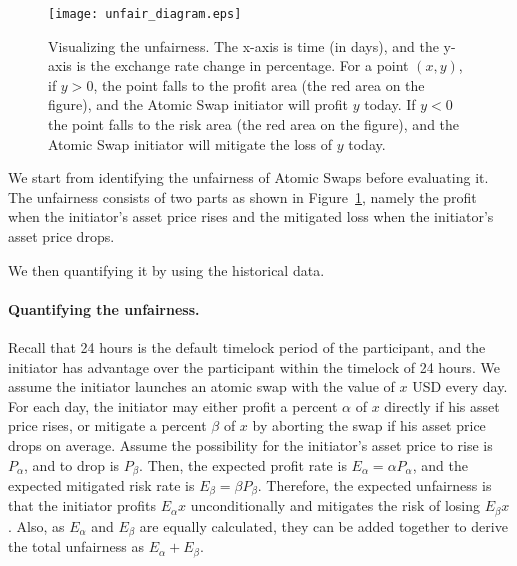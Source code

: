 \begin{figure}
    \texttt{[image: unfair\_diagram.eps]}
    \caption{Visualizing the unfairness. The x-axis is time (in days), and the y-axis is the exchange rate change in percentage. For a point $(x, y)$, if $y > 0$, the point falls to the profit area (the red area on the figure), and the Atomic Swap initiator will profit $y$ today. If $y < 0$ the point falls to the risk area (the red area on the figure), and the Atomic Swap initiator will mitigate the loss of $y$ today. }
    \label{fig:unfair_diagram}
\end{figure}

We start from identifying the unfairness of Atomic Swaps before evaluating it.
The unfairness consists of two parts as shown in Figure~\ref{fig:unfair_diagram}, namely the profit when the initiator's asset price rises and the mitigated loss when the initiator's asset price drops.

We then quantifying it by using the historical data.

\paragraph{Quantifying the unfairness.}
Recall that 24 hours is the default timelock period of the participant, 
and the initiator has advantage over the participant within the timelock of 24 hours.
We assume the initiator launches an atomic swap with the value of $x$ USD every day. 
For each day, the initiator may either profit a percent $\alpha$ of $x$ directly if his asset price rises,
or mitigate a percent $\beta$ of $x$ by aborting the swap if his asset price drops on average. 
Assume the possibility for the initiator's asset price to rise is $P_{\alpha}$, and to drop is $P_{\beta}$.
Then, the expected profit rate is $E_{\alpha} = \alpha P_{\alpha}$,
and the expected mitigated risk rate is $E_{\beta} = \beta P_{\beta}$.
Therefore, the expected unfairness is that the initiator profits $E_{\alpha} x$ unconditionally and mitigates the risk of losing $E_{\beta} x$.
Also, as $E_\alpha$ and $E_\beta$ are equally calculated, they can be added together to derive the total unfairness as $E_\alpha + E_\beta$.

